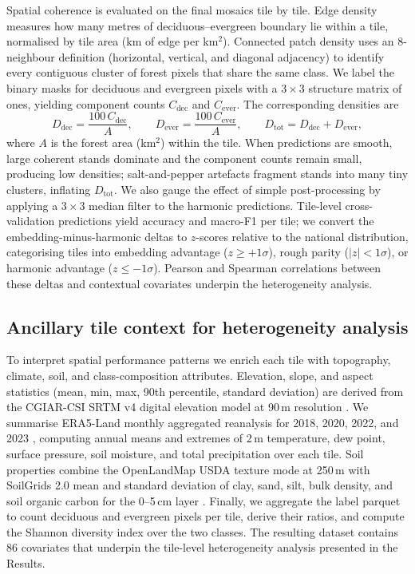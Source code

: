 \documentclass[utf8]{FrontiersinHarvard}
\begin{document}
Spatial coherence is evaluated on the final mosaics tile by tile. Edge density measures how many metres of deciduous–evergreen boundary lie within a tile, normalised by tile area (km of edge per km$^2$). Connected patch density uses an 8-neighbour definition (horizontal, vertical, and diagonal adjacency) to identify every contiguous cluster of forest pixels that share the same class. We label the binary masks for deciduous and evergreen pixels with a \(3\times3\) structure matrix of ones, yielding component counts \(C_{\text{dec}}\) and \(C_{\text{ever}}\). The corresponding densities are
\begin{equation*}
    D_{\text{dec}} = \frac{100\,C_{\text{dec}}}{A}, \qquad
    D_{\text{ever}} = \frac{100\,C_{\text{ever}}}{A}, \qquad
    D_{\text{tot}} = D_{\text{dec}} + D_{\text{ever}},
\end{equation*}
where \(A\) is the forest area (km$^2$) within the tile. When predictions are smooth, large coherent stands dominate and the component counts remain small, producing low densities; salt-and-pepper artefacts fragment stands into many tiny clusters, inflating \(D_{\text{tot}}\). We also gauge the effect of simple post-processing by applying a \(3 \times 3\) median filter to the harmonic predictions. Tile-level cross-validation predictions yield accuracy and macro-F1 per tile; we convert the embedding-minus-harmonic deltas to $z$-scores relative to the national distribution, categorising tiles into embedding advantage (\(z \ge +1\sigma\)), rough parity (\(|z| < 1\sigma\)), or harmonic advantage (\(z \le -1\sigma\)). Pearson and Spearman correlations between these deltas and contextual covariates underpin the heterogeneity analysis.

\subsection{Ancillary tile context for heterogeneity analysis}
To interpret spatial performance patterns we enrich each tile with topography, climate, soil, and class-composition attributes. Elevation, slope, and aspect statistics (mean, min, max, 90th percentile, standard deviation) are derived from the CGIAR-CSI SRTM v4 digital elevation model at 90\,m resolution \citep{Jarvis2008SRTM}. We summarise ERA5-Land monthly aggregated reanalysis for 2018, 2020, 2022, and 2023 \citep{MunozSabater2021ERA5Land}, computing annual means and extremes of 2\,m temperature, dew point, surface pressure, soil moisture, and total precipitation over each tile. Soil properties combine the OpenLandMap USDA texture mode at 250\,m \citep{Hengl2021OpenLandMap} with SoilGrids 2.0 mean and standard deviation of clay, sand, silt, bulk density, and soil organic carbon for the 0–5\,cm layer \citep{Poggio2021SoilGrids}. Finally, we aggregate the label parquet to count deciduous and evergreen pixels per tile, derive their ratios, and compute the Shannon diversity index over the two classes. The resulting dataset contains 86 covariates that underpin the tile-level heterogeneity analysis presented in the Results.
\end{document}
